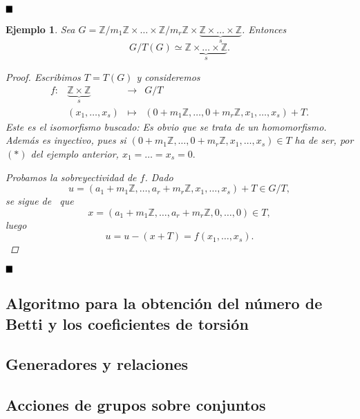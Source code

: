 \documentclass[12pt]{article}
\newtheorem{example}{Ejemplo}[theorem]
\begin{document}
$\hfill \blacksquare$

\begin{example}
Sea $G = \mathbb{Z}/m_1\mathbb{Z} \times \ldots \times \mathbb{Z}/m_r\mathbb{Z} \times \underbrace{\mathbb{Z} \times \ldots \times \mathbb{Z}}_s$. Entonces $$G/T(G) \simeq \underbrace{\mathbb{Z} \times \ldots \times \mathbb{Z}}_s.$$

\begin{proof}
Escribimos $T= T(G)$ y consideremos $$\begin{array}{rccl}
f\colon &\underbrace{\mathbb{Z}\times \mathbb{Z}}_s& \longrightarrow & G/T\\
&(x_1, \ldots, x_s)& \longmapsto &(0 + m_1\mathbb{Z}, \ldots, 0 +m_r\mathbb{Z}, x_1, \ldots, x_s) + T.
\end{array}
$$ 
Este es el isomorfismo buscado: Es obvio que se trata de un homomorfismo. Además es inyectivo, pues si $(0 + m_1\mathbb{Z}, \ldots, 0 + m_r\mathbb{Z}, x_1, \ldots, x_s) \in T$ ha de ser, por $(\ast)$ del ejemplo anterior, $x_1 = \ldots = x_s = 0.$

Probamos la sobreyectividad de $f$. Dado $$u = (a_1 + m_1\mathbb{Z}, \ldots, a_r + m_r\mathbb{Z}, x_1, \ldots, x_s) + T \in G/T,$$ se sigue de~ que $$x = (a_1+ m_1\mathbb{Z}, \ldots, a_r+m_r\mathbb{Z}, 0, \ldots, 0) \in T,$$ luego $$u= u-(x+T) = f(x_1, \ldots, x_s).$$

\end{proof}

\end{example}

$\hfill \blacksquare$






\subsection{Algoritmo para la obtención del número de Betti y los coeficientes de torsión}
\subsection{Generadores y relaciones}
\subsection{Acciones de grupos sobre conjuntos}
\end{document}
